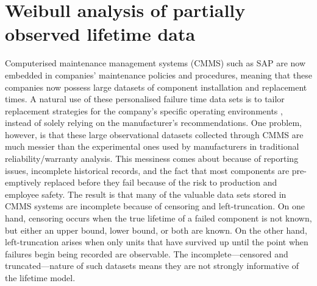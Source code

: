 \chapter{Weibull analysis of partially observed lifetime data} \label{chap:chapter2}

Computerised maintenance management systems (CMMS) such as SAP \citep{sap} are now embedded in companies' maintenance policies and procedures, meaning that these companies now possess large datasets of component installation and replacement times. A natural use of these personalised failure time data sets is to tailor replacement strategies for the company's specific operating environments \citep[p. 13]{Meeker2022}, instead of solely relying on the manufacturer's recommendations. One problem, however, is that these large observational datasets collected through CMMS are much messier than the experimental ones used by manufacturers in traditional reliability/warranty analysis. This messiness comes about because of reporting issues, incomplete historical records, and the fact that most components are pre-emptively replaced before they fail because of the risk to production and employee safety. The result is that many of the valuable data sets stored in CMMS systems are incomplete because of censoring and left-truncation. On one hand, censoring occurs when the true lifetime of a failed component is not known, but either an upper bound, lower bound, or both are known. On the other hand, left-truncation arises when only units that have survived up until the point when failures begin being recorded are observable. The incomplete---censored and truncated---nature of such datasets means they are not strongly informative of the lifetime model.

